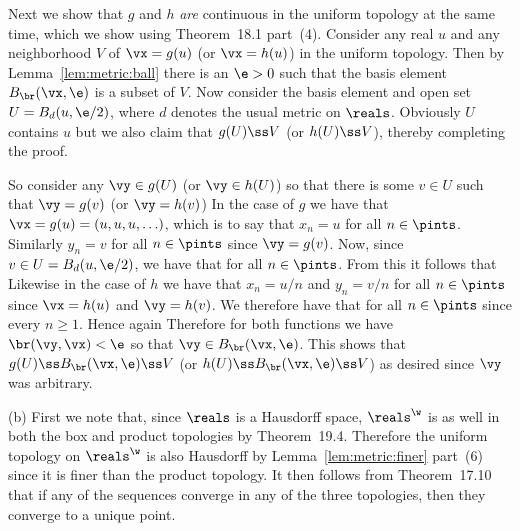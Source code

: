 {{    Next we show that $g$ and $h$ \emph{are} continuous in the uniform topology at the same time, which we show using Theorem~18.1 part~(4).
    Consider any real $u$ and any neighborhood $V$ of $\vx = g(u)$ (or $\vx = h(u)$) in the uniform topology.
    Then by Lemma~\ref{lem:metric:ball} there is an $\e > 0$ such that the basis element $B_{\br}(\vx, \e)$ is a subset of $V$.
    Now consider the basis element and open set $U = B_d(u, \e/2)$, where $d$ denotes the usual metric on $\reals$.
    Obviously $U$ contains $u$ but we also claim that $g(U) \ss V$ (or $h(U) \ss V$), thereby completing the proof.

    So consider any $\vy \in g(U)$ (or $\vy \in h(U)$) so that there is some $v \in U$ such that $\vy = g(v)$ (or $\vy = h(v)$)
    In the case of $g$ we have that $\vx = g(u) = (u,u,u,\ldots)$, which is to say that $x_n = u$ for all $n \in \pints$.
    Similarly $y_n = v$ for all $n \in \pints$ since $\vy = g(v)$.
    Now, since $v \in U = B_d(u,\e/2)$, we have that
    for all $n \in \pints$.
    From this it follows that
    Likewise in the case of $h$ we have that $x_n = u/n$ and $y_n = v/n$ for all $n \in \pints$ since $\vx = h(u)$ and $\vy = h(v)$.
    We therefore have that
    for all $n \in \pints$ since every $n \geq 1$.
    Hence again
    Therefore for both functions we have $\br(\vy, \vx) < \e$ so that $\vy \in B_{\br}(\vx, \e)$.
    This shows that $g(U) \ss B_{\br}(\vx, \e) \ss V$ (or $h(U) \ss B_{\br}(\vx, \e) \ss V$) as desired since $\vy$ was arbitrary.
  }

  (b) First we note that, since $\reals$ is a Hausdorff space, $\reals^\w$ is as well in both the box and product topologies by Theorem~19.4.
  Therefore the uniform topology on $\reals^\w$ is also Hausdorff by Lemma~\ref{lem:metric:finer} part~(6) since it is finer than the product topology.
  It then follows from Theorem~17.10 that if any of the sequences converge in any of the three topologies, then they converge to a unique point.

}
